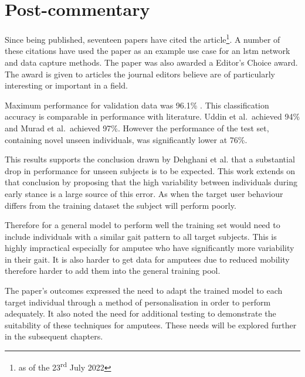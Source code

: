 \section{Post-commentary}
Since being published, seventeen papers have cited the article\footnote{as of the 23\textsuperscript{rd} July 2022}. A number of these citations have used the paper as an example use case for an \acrshort{lstm} network\cite{Uddin2021, Du2021, Velezguerrero2021, Low2022, Bittibssi2022} and data capture methods\cite{Shin2021, Su2021}. The paper was also awarded a Editor's Choice award. The award is given to articles the journal editors believe are of particularly interesting or important in a field.

Maximum performance for validation data was 96.1\% . This classification accuracy is comparable in performance with literature. Uddin et al.~achieved 94\%\cite{Uddin2021} and Murad et al.~achieved 97\%\cite{Murad2017}. However the performance of the test set, containing novel unseen individuals, was significantly lower at 76\%. 

This results supports the conclusion drawn by Dehghani et al. that a substantial drop in performance for unseen subjects is to be expected\cite{Dehghani2019}. This work extends on that conclusion by proposing that the high variability between individuals during early stance is a large source of this error. As when the target user behaviour differs from the training dataset the subject will perform poorly\cite{Qiu2022}. 

Therefore for a general model to perform well the training set would need to include individuals with a similar gait pattern to all target subjects. This is highly impractical especially for amputee who have significantly more variability in their gait\cite{Lechler2018, Kovac2009}. It is also harder to get data for amputees due to reduced mobility therefore harder to add them into the general training pool\cite{Gardiner2016}.

The paper's outcomes expressed the need to adapt the trained model to each target individual through a method of personalisation in order to perform adequately. It also noted the need for additional testing to demonstrate the suitability of these techniques for amputees. These needs will be explored further in the subsequent chapters.

